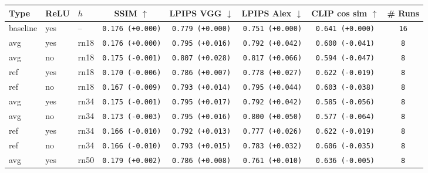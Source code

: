 \begin{tabular}{|l|l|l|c|c|c|c|c|}
\hline
Type & ReLU & $h$ & SSIM $\uparrow$ & LPIPS VGG $\downarrow$ & LPIPS Alex $\downarrow$ & CLIP cos sim $\uparrow$ & \# Runs \\
\hline
\rowcolor{verylightgray}baseline & yes & -- & \texttt{0.176 {\color{black}(+0.000)}} & \texttt{0.779 {\color{black}(+0.000)}} & \texttt{0.751 {\color{black}(+0.000)}} & \texttt{0.641 {\color{black}(+0.000)}} & \texttt{16} \\
\hline
avg & yes & rn18 & \texttt{0.176 {\color{black}(+0.000)}} & \texttt{0.795 {\color{red}(+0.016)}} & \texttt{0.792 {\color{red}(+0.042)}} & \texttt{0.600 {\color{red}(-0.041)}} & \texttt{8} \\
avg & no & rn18 & \texttt{0.175 {\color{red}(-0.001)}} & \texttt{0.807 {\color{red}(+0.028)}} & \texttt{0.817 {\color{red}(+0.066)}} & \texttt{0.594 {\color{red}(-0.047)}} & \texttt{8} \\
ref & yes & rn18 & \texttt{0.170 {\color{red}(-0.006)}} & \texttt{0.786 {\color{red}(+0.007)}} & \texttt{0.778 {\color{red}(+0.027)}} & \texttt{0.622 {\color{red}(-0.019)}} & \texttt{8} \\
ref & no & rn18 & \texttt{0.167 {\color{red}(-0.009)}} & \texttt{0.793 {\color{red}(+0.014)}} & \texttt{0.795 {\color{red}(+0.044)}} & \texttt{0.603 {\color{red}(-0.038)}} & \texttt{8} \\
\hline
avg & yes & rn34 & \texttt{0.175 {\color{red}(-0.001)}} & \texttt{0.795 {\color{red}(+0.017)}} & \texttt{0.792 {\color{red}(+0.042)}} & \texttt{0.585 {\color{red}(-0.056)}} & \texttt{8} \\
avg & no & rn34 & \texttt{0.173 {\color{red}(-0.003)}} & \texttt{0.795 {\color{red}(+0.016)}} & \texttt{0.800 {\color{red}(+0.050)}} & \texttt{0.577 {\color{red}(-0.064)}} & \texttt{8} \\
ref & yes & rn34 & \texttt{0.166 {\color{red}(-0.010)}} & \texttt{0.792 {\color{red}(+0.013)}} & \texttt{0.777 {\color{red}(+0.026)}} & \texttt{0.622 {\color{red}(-0.019)}} & \texttt{8} \\
ref & no & rn34 & \texttt{0.166 {\color{red}(-0.010)}} & \texttt{0.793 {\color{red}(+0.015)}} & \texttt{0.783 {\color{red}(+0.032)}} & \texttt{0.606 {\color{red}(-0.035)}} & \texttt{8} \\
\hline
avg & yes & rn50 & \texttt{0.179 {\color{green}(+0.002)}} & \texttt{0.786 {\color{red}(+0.008)}} & \texttt{0.761 {\color{red}(+0.010)}} & \texttt{0.636 {\color{red}(-0.005)}} & \texttt{8} \\

\end{tabular}
